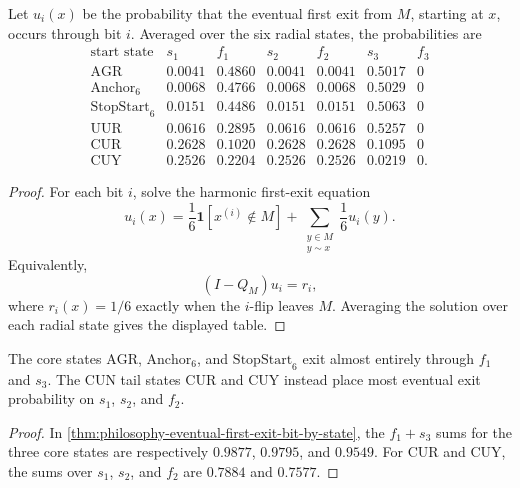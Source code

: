 \begin{theorem}
\label{thm:philosophy-eventual-first-exit-bit-by-state}
Let $u_{i}(x)$ be the probability that the eventual first exit from
$M$, starting at $x$, occurs through bit $i$. Averaged over the six
radial states, the probabilities are
$$
\begin{array}{c|rrrrrr}
  \text{start state} & s_{1}&f_{1}&s_{2}&f_{2}&s_{3}&f_{3}\\
  \hline
  \mathrm{AGR} & 0.0041&0.4860&0.0041&0.0041&0.5017&0\\
  \mathrm{Anchor}_{6} & 0.0068&0.4766&0.0068&0.0068&0.5029&0\\
  \mathrm{StopStart}_{6} & 0.0151&0.4486&0.0151&0.0151&0.5063&0\\
  \mathrm{UUR} & 0.0616&0.2895&0.0616&0.0616&0.5257&0\\
  \mathrm{CUR} & 0.2628&0.1020&0.2628&0.2628&0.1095&0\\
  \mathrm{CUY} & 0.2526&0.2204&0.2526&0.2526&0.0219&0.
\end{array}
$$
\end{theorem}
\begin{proof}
For each bit $i$, solve the harmonic first-exit equation
$$
  u_{i}(x)=
  \frac{1}{6}\mathbf 1[x^{(i)}\notin M]
  +
  \sum_{\substack{y\in M\\y\sim x}}\frac{1}{6}u_{i}(y).
$$
Equivalently,
$$
  (I-Q_{M})u_{i}=r_{i},
$$
where $r_{i}(x)=1/6$ exactly when the $i$-flip leaves $M$. Averaging the
solution over each radial state gives the displayed table.
\end{proof}

\begin{corollary}
\label{cor:philosophy-core-tail-exit-mechanisms}
The core states $\mathrm{AGR}$, $\mathrm{Anchor}_{6}$, and
$\mathrm{StopStart}_{6}$ exit almost entirely through $f_{1}$ and
$s_{3}$. The CUN tail states $\mathrm{CUR}$ and $\mathrm{CUY}$ instead
place most eventual exit probability on $s_{1}$, $s_{2}$, and $f_{2}$.
\end{corollary}
\begin{proof}
In \autoref{thm:philosophy-eventual-first-exit-bit-by-state}, the
$f_{1}+s_{3}$ sums for the three core states are respectively
$0.9877$, $0.9795$, and $0.9549$. For $\mathrm{CUR}$ and $\mathrm{CUY}$,
the sums over $s_{1}$, $s_{2}$, and $f_{2}$ are $0.7884$ and $0.7577$.
\end{proof}

